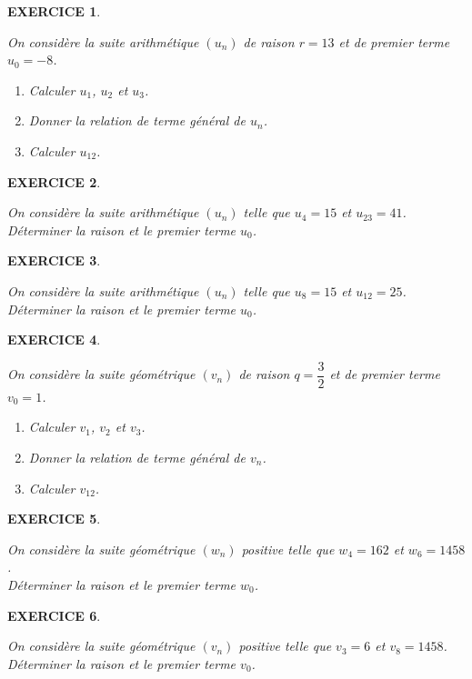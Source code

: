 \documentclass[a4paper]{article}   %
\renewcommand{\(}{\left(}
\renewcommand{\)}{\right)}
\newtheorem{EXO}{\large EXERCICE }
\newenvironment{EX}   { \setcounter{ques}{0} \begin{EXO} \hrulefill ~\vspace{0.3cm}

\normalfont}    {\end{EXO} \medskip}
\newcommand{\f}{\dfrac} 	%
\begin{document}
\begin{center} 	
\end{center}


\begin{EX} On considère la suite arithmétique $(u_n)$ de raison $r=13$ et de premier terme $u_0=-8$. \begin{enumerate}
\item Calculer $u_1$, $u_2$ et $u_3$. 
\item Donner la relation de terme général de $u_n$.
\item Calculer $u_{12}$.
\end{enumerate}
\end{EX}

\begin{EX} On considère la suite arithmétique $(u_n)$ telle que $u_{4}=15$ et $u_{23}=41$. \\
Déterminer la raison et le premier terme $u_0$. 
\end{EX}


\begin{EX} On considère la suite arithmétique $(u_n)$ telle que $u_{8}=15$ et $u_{12}=25$. \\
Déterminer la raison et le premier terme $u_0$. 
\end{EX}


\begin{EX} On considère la suite géométrique $(v_n)$ de raison $q=\f{3}{2}$ et de premier terme $v_0=1$. \begin{enumerate}
\item Calculer $v_1$, $v_2$ et $v_3$. 
\item Donner la relation de terme général de $v_n$.
\item Calculer $v_{12}$.
\end{enumerate}
\end{EX}

\begin{EX} On considère la suite géométrique $(w_n)$ positive telle que $w_{4}=162$ et $w_{6}=1458$. \\
Déterminer la raison et le premier terme $w_0$. 
\end{EX}

\begin{EX} On considère la suite géométrique $(v_n)$ positive telle que $v_{3}=6$ et $v_{8}=1458$. \\
Déterminer la raison et le premier terme $v_0$. 
\end{EX}
\end{document}
